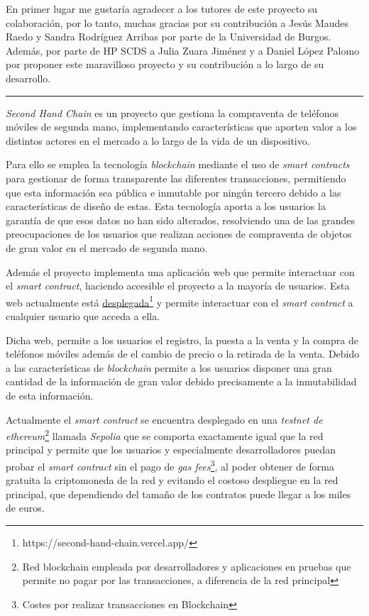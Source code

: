 
En primer lugar me gustaría agradecer a los tutores de este proyecto su colaboración, por lo tanto, muchas gracias por su contribución a Jesús Maudes Raedo y Sandra Rodríguez Arribas por parte de la Universidad de Burgos. Además, por parte de HP SCDS a Julia Zuara Jiménez y a Daniel López Palomo por proponer este maravilloso proyecto y su contribución a lo largo de su desarrollo.

\noindent\rule{4cm}{0.5pt}

\textit{Second Hand Chain} es un proyecto que gestiona la compraventa de teléfonos móviles de segunda mano, implementando características que aporten valor a los distintos actores en el mercado a lo largo de la vida de un dispositivo.

Para ello se emplea la tecnología \textit{blockchain} mediante el uso de \textit{smart contracts} para gestionar de forma transparente las diferentes transacciones, permitiendo que esta información sea pública e inmutable por ningún tercero debido a las características de diseño de estas. Esta tecnología aporta a los usuarios la garantía de que esos datos no han sido alterados, resolviendo una de las grandes preocupaciones de los usuarios que realizan acciones de compraventa de objetos de gran valor en el mercado de segunda mano.

Además el proyecto implementa una aplicación web que permite interactuar con el \textit{smart contract}, haciendo accesible el proyecto a la mayoría de usuarios. Esta web actualmente está \href{https://second-hand-chain.vercel.app/}{desplegada}\footnote{https://second-hand-chain.vercel.app/} y permite interactuar con el \textit{smart contract} a cualquier usuario que acceda a ella.

Dicha web, permite a los usuarios el registro, la puesta a la venta y la compra de teléfonos móviles además de el cambio de precio o la retirada de la venta. Debido a las características de \textit{blockchain} permite a los usuarios disponer una gran cantidad de la información de gran valor debido precisamente a la inmutabilidad de esta información.

Actualmente el \textit{smart contract} se encuentra desplegado en una \textit{testnet de ethereum}\footnote{Red blockchain empleada por desarrolladores y aplicaciones en pruebas que permite no pagar por las transacciones, a diferencia de la red principal} llamada \textit{Sepolia} que se comporta exactamente igual que la red principal y permite que los usuarios y especialmente desarrolladores puedan probar el \textit{smart contract} sin el pago de \textit{gas fees}\footnote{Costes por realizar transacciones en Blockchain}, al poder obtener de forma gratuita la criptomoneda de la red y evitando el costoso despliegue en la red principal, que dependiendo del tamaño de los contratos puede llegar a los miles de euros.

